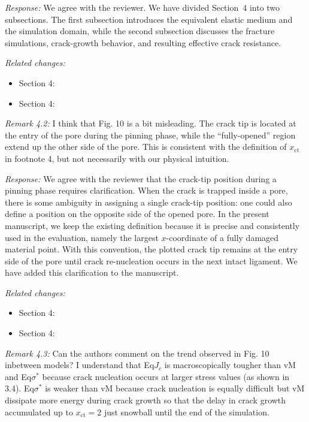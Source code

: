 \documentclass[pdflatex,sn-mathphys-num]{sn-jnl}
\begin{document}
\emph{Response:} We agree with the reviewer. We have divided Section~4 into two subsections. The first subsection introduces the equivalent elastic medium and the simulation domain, while the second subsection discusses the fracture simulations, crack-growth behavior, and resulting effective crack resistance.

\emph{Related changes:}
\begin{itemize}
\item Section 4: 
\item Section 4: 
\end{itemize}

\emph{Remark 4.2:} I think that Fig. 10 is a bit misleading. The crack tip is located at the entry of the pore during the pinning phase, while the ``fully-opened'' region extend up the other side of the pore. This is consistent with the definition of $x_{\mathrm{ct}}$ in footnote 4, but not necessarily with our physical intuition.

\emph{Response:} We agree with the reviewer that the crack-tip position during a pinning phase requires clarification. When the crack is trapped inside a pore, there is some ambiguity in assigning a single crack-tip position: one could also define a position on the opposite side of the opened pore. In the present manuscript, we keep the existing definition because it is precise and consistently used in the evaluation, namely the largest $x$-coordinate of a fully damaged material point. With this convention, the plotted crack tip remains at the entry side of the pore until crack re-nucleation occurs in the next intact ligament. We have added this clarification to the manuscript.

\emph{Related changes:}
\begin{itemize}
\item Section 4: 
\item Section 4: 
\end{itemize}

\emph{Remark 4.3:} Can the authors comment on the trend observed in Fig. 10 inbetween models? I understand that Eq$J_c$ is macroscopically tougher than vM and Eq$\sigma^*$ because crack nucleation occurs at larger stress values (as shown in 3.4). Eq$\sigma^*$ is weaker than vM because crack nucleation is equally difficult but vM dissipate more energy during crack growth so that the delay in crack growth accumulated up to $x_{\mathrm{ct}} = 2$ just snowball until the end of the simulation.
\end{document}
